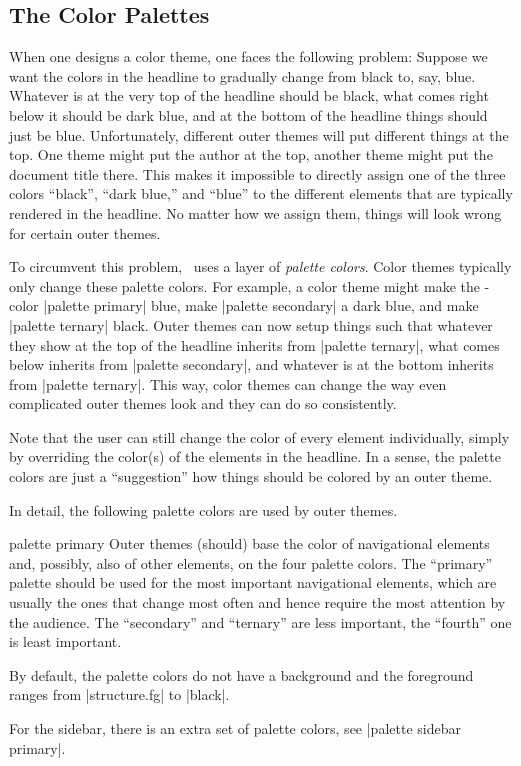 \subsection{The Color Palettes}

When one designs a color theme, one faces the following problem:
Suppose we want the colors in the headline to gradually change from
black to, say, blue. Whatever is at the very top of the headline
should be black, what comes right below it should be dark blue, and at
the bottom of the headline things should just be blue. Unfortunately,
different outer themes will put different things at the top. One theme
might put the author at the top, another theme might put the document
title there. This makes it impossible to directly assign one of the
three colors ``black'', ``dark blue,'' and ``blue'' to the different
elements that are typically rendered in the headline. No matter how we
assign them, things will look wrong for certain outer themes.

To circumvent this problem, \beamer\ uses a layer of \emph{palette
colors}. Color themes typically only change these palette colors. For
example, a color theme might make the \beamer-color |palette primary|
blue, make |palette secondary| a dark blue, and make |palette ternary|
black. Outer themes can now setup things such that whatever they show
at the top of the headline inherits from |palette ternary|, what comes
below inherits from |palette secondary|, and whatever is at the bottom
inherits from |palette ternary|. This way, color themes can change the
way even complicated outer themes look and they can do so
consistently.

Note that the user can still change the color of every element
individually, simply by overriding the color(s) of the elements in the
headline. In a sense, the palette colors are just a ``suggestion'' how
things should be colored by an outer theme.

In detail, the following palette colors are used by outer themes.


\begin{element}{palette primary}\no\yes\no
  Outer themes (should) base the color of navigational elements and,
  possibly, also of other elements, on the four palette colors. The
  ``primary'' palette should be used for the most important
  navigational elements, which are usually the ones that change most
  often and hence require the most attention by the audience. The
  ``secondary'' and ``ternary'' are less important, the ``fourth'' one
  is least important.

  By default, the palette colors do not have a background and the
  foreground ranges from |structure.fg| to |black|.

  For the sidebar, there is an extra set of palette colors, see
  |palette sidebar primary|. 
\end{element}

